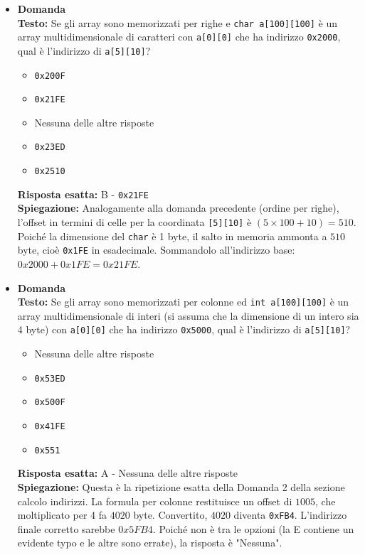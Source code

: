\documentclass[12pt, a4paper]{article}
\newcounter{domandateoria}
\begin{document}
\begin{itemize}
\newpage

    \item {}\textbf{Domanda \thedomandateoria} \\
    \textbf{Testo:} Se gli array sono memorizzati per righe e \texttt{char a[100][100]} è un array multidimensionale di caratteri con \texttt{a[0][0]} che ha indirizzo \texttt{0x2000}, qual è l'indirizzo di \texttt{a[5][10]}?
    \begin{itemize}
        \item[A)] \texttt{0x200F}
        \item[B)] \texttt{0x21FE}
        \item[C)] Nessuna delle altre risposte
        \item[D)] \texttt{0x23ED}
        \item[E)] \texttt{0x2510}
    \end{itemize}
    \textbf{Risposta esatta:} B - \texttt{0x21FE} \\
    \textbf{Spiegazione:} Analogamente alla domanda precedente (ordine per righe), l'offset in termini di celle per la coordinata \texttt{[5][10]} è $(5 \times 100 + 10) = 510$. Poiché la dimensione del \texttt{char} è 1 byte, il salto in memoria ammonta a $510$ byte, cioè \texttt{0x1FE} in esadecimale. Sommandolo all'indirizzo base: $0x2000 + 0x1FE = 0x21FE$.
    \vspace{0.3cm}

    \item {}\textbf{Domanda \thedomandateoria} \\
    \textbf{Testo:} Se gli array sono memorizzati per colonne ed \texttt{int a[100][100]} è un array multidimensionale di interi (si assuma che la dimensione di un intero sia 4 byte) con \texttt{a[0][0]} che ha indirizzo \texttt{0x5000}, qual è l'indirizzo di \texttt{a[5][10]}?
    \begin{itemize}
        \item[A)] Nessuna delle altre risposte
        \item[B)] \texttt{0x53ED}
        \item[C)] \texttt{0x500F}
        \item[D)] \texttt{0x41FE}
        \item[E)] \texttt{0x551}
    \end{itemize}
    \textbf{Risposta esatta:} A - Nessuna delle altre risposte \\
    \textbf{Spiegazione:} Questa è la ripetizione esatta della Domanda 2 della sezione calcolo indirizzi. La formula per colonne restituisce un offset di $1005$, che moltiplicato per 4 fa $4020$ byte. Convertito, $4020$ diventa \texttt{0xFB4}. L'indirizzo finale corretto sarebbe $0x5FB4$. Poiché non è tra le opzioni (la E contiene un evidente typo e le altre sono errate), la risposta è "Nessuna".
    \vspace{0.3cm}


\end{itemize}
\end{document}
